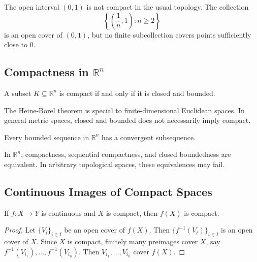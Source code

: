 \begin{example}
The open interval $(0,1)$ is not compact in the usual topology. The collection
\[
    \left\{\left(\frac{1}{n},1\right):n\geq 2\right\}
\]
is an open cover of $(0,1)$, but no finite subcollection covers points sufficiently close to $0$.
\end{example}

\subsection{Compactness in $\mathbb{R}^n$}

\begin{theorem}
A subset $K\subseteq\mathbb{R}^n$ is compact if and only if it is closed and bounded.
\end{theorem}

\begin{remark}
The Heine-Borel theorem is special to finite-dimensional Euclidean spaces. In general metric spaces, closed and bounded does not necessarily imply compact.
\end{remark}

\begin{theorem}
Every bounded sequence in $\mathbb{R}^n$ has a convergent subsequence.
\end{theorem}

\begin{remark}
In $\mathbb{R}^n$, compactness, sequential compactness, and closed boundedness are equivalent. In arbitrary topological spaces, these equivalences may fail.
\end{remark}

\subsection{Continuous Images of Compact Spaces}

\begin{theorem}
If $f:X\to Y$ is continuous and $X$ is compact, then $f(X)$ is compact.
\end{theorem}

\begin{proof}
Let $\{V_i\}_{i\in I}$ be an open cover of $f(X)$. Then $\{f^{-1}(V_i)\}_{i\in I}$ is an open cover of $X$. Since $X$ is compact, finitely many preimages cover $X$, say $f^{-1}(V_{i_1}),\dots,f^{-1}(V_{i_n})$. Then $V_{i_1},\dots,V_{i_n}$ cover $f(X)$.
\end{proof}


